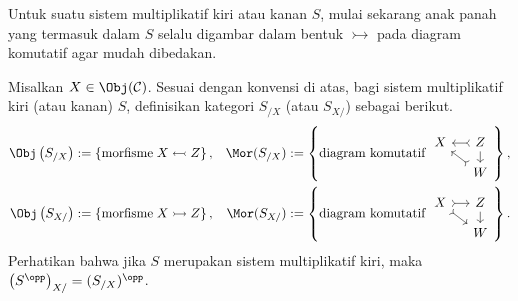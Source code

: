 \begin{konvensi}
	Untuk suatu sistem multiplikatif kiri atau kanan $S$, mulai sekarang anak
	panah yang termasuk dalam $S$ selalu digambar dalam bentuk
	$\rightarrowtail$ pada diagram komutatif agar mudah dibedakan.
\end{konvensi}

Misalkan $X \in \Obj(\mathcal{C})$. Sesuai dengan konvensi di atas, bagi
sistem multiplikatif kiri (atau kanan) $S$, definisikan kategori $S_{/X}$
(atau $S_{X/}$) sebagai berikut.
\begin{align*}
	\Obj\left( S_{/X} \right) & := \left\{ \text{morfisme}\; X \leftarrowtail Z \right\}, & \Mor(S_{/X}) & := \left\{ \text{diagram komutatif}\;
	{\begin{tikzcd}[row sep=small, column sep=small, ampersand replacement=\&]
			X \& Z \arrow[rightarrowtail, l] \arrow[d] \\
			\& W \arrow[rightarrowtail, lu]	
	\end{tikzcd}} \right\}, \\
	\Obj\left( S_{X/} \right) & := \left\{ \text{morfisme}\; X \rightarrowtail Z \right\}, & \Mor(S_{X/}) & := \left\{ \text{diagram komutatif}\;
	{\begin{tikzcd}[row sep=small, column sep=small, ampersand replacement=\&]
			X \arrow[rightarrowtail, r] \arrow[rightarrowtail, rd] \& Z \arrow[d] \\
			\& W	
	\end{tikzcd}} \right\}.
\end{align*}
Perhatikan bahwa jika $S$ merupakan sistem multiplikatif kiri, maka
$\left(S^{\opp}\right)_{X/} = (S_{/X})^{\opp}$.

